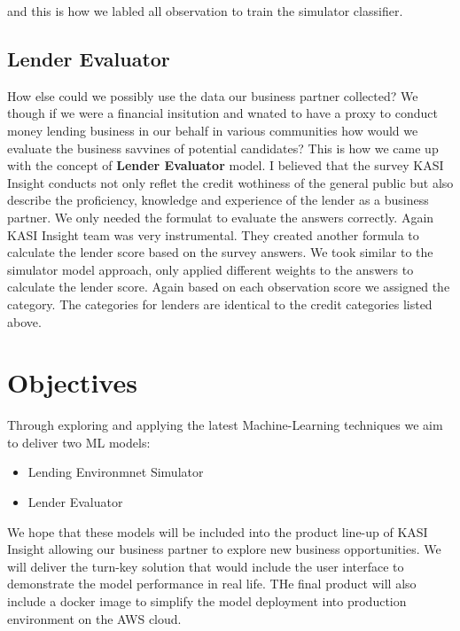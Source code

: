 and this is how we labled all observation to train the simulator
classifier.

\hypertarget{lender-evaluator}{%
\subsection{Lender Evaluator}\label{lender-evaluator}}

How else could we possibly use the data our business partner collected?
We though if we were a financial insitution and wnated to have a proxy
to conduct money lending business in our behalf in various communities
how would we evaluate the business savvines of potential candidates?
This is how we came up with the concept of \textbf{Lender Evaluator}
model. I believed that the survey KASI Insight conducts not only reflet
the credit wothiness of the general public but also describe the
proficiency, knowledge and experience of the lender as a business
partner. We only needed the formulat to evaluate the answers correctly.
Again KASI Insight team was very instrumental. They created another
formula to calculate the lender score based on the survey answers. We
took similar to the simulator model approach, only applied different
weights to the answers to calculate the lender score. Again based on
each observation score we assigned the category. The categories for
lenders are identical to the credit categories listed above.

\hypertarget{objectives}{%
\section{Objectives}\label{objectives}}

Through exploring and applying the latest Machine-Learning techniques we
aim to deliver two ML models:

\begin{itemize}
\item
  Lending Environmnet Simulator
\item
  Lender Evaluator
\end{itemize}

We hope that these models will be included into the product line-up of
KASI Insight allowing our business partner to explore new business
opportunities. We will deliver the turn-key solution that would include
the user interface to demonstrate the model performance in real life.
THe final product will also include a docker image to simplify the model
deployment into production environment on the AWS cloud.

